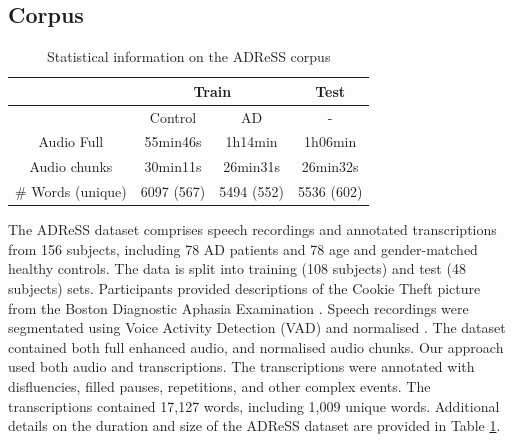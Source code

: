 \subsection{Corpus}
\begin{table}[]
  \begin{center}
   \begin{tabular}{c|ccc}
    \hline
                    & \multicolumn{2}{c}{Train} & Test       \\\hline
                    & Control     & AD          & -          \\
  Audio Full        & 55min46s    & 1h14min     & 1h06min    \\
  Audio chunks      & 30min11s    & 26min31s    & 26min32s   \\
  \# Words (unique) & 6097 (567)  & 5494 (552)  & 5536 (602) \\ \hline
  \end{tabular}
  \caption{Statistical information on the ADReSS corpus}
  \label{tab:adress_data}
  \end{center}
  \end{table}
The ADReSS dataset comprises speech recordings and annotated transcriptions from 156 subjects, including 78 AD patients and 78 age and gender-matched healthy controls. The data is split into training (108 subjects) and test (48 subjects) sets. Participants provided descriptions of the Cookie Theft picture from the Boston Diagnostic Aphasia Examination \cite{goodglass2001bdae}. Speech recordings were segmentated using Voice Activity Detection (VAD) and normalised \cite{luz2020alzheimer}. The dataset contained both full enhanced audio, and normalised audio chunks. Our approach used both audio and transcriptions. The transcriptions were annotated with disfluencies, filled pauses, repetitions, and other complex events. The transcriptions contained 17,127 words, including 1,009 unique words. Additional details on the duration and size of the ADReSS dataset are provided in Table \ref{tab:adress_data}.
